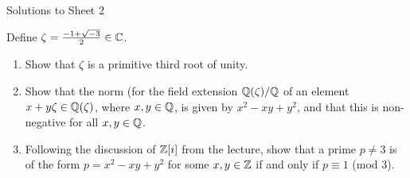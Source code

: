 \documentclass[a4paper,11pt]{article}
\begin{document}
\begin{center}
    \huge{Solutions to Sheet 2}
\end{center}

Define $\zeta = \frac{-1 + \sqrt{-3}}2 \in \mathbb{C}$. 
\begin{enumerate}
    \item Show that $\zeta$ is a primitive third root of unity.
    \item Show that the norm (for the field extension $\mathbb{Q}(\zeta)/\mathbb{Q}$ of
        an element $x + y\zeta \in \mathbb{Q}(\zeta)$, where $x,y \in \mathbb{Q}$, is given by
        $x^2 - xy + y^2$, and that this is non-negative for all $x,y \in \mathbb{Q}$. 
    \item  Following the discussion of $\mathbb{Z}[i]$ from the lecture, show that a prime
        $p \neq 3$ is of the form $p = x^2 - xy + y^2$ for some $x,y \in \mathbb{Z}$ if
        and only if $p \equiv 1$ (mod $3$). 
\end{enumerate}
\end{document}
